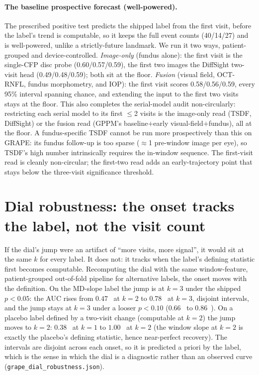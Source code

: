 \paragraph{The baseline prospective forecast (well-powered).} The prescribed positive test predicts the shipped label
from the first visit, before the label's trend is computable, so it keeps the full event counts (\num{40}/\num{14}/\num{27})
and is well-powered, unlike a strictly-future landmark. We run it two ways, patient-grouped and device-controlled.
\emph{Image-only} (fundus alone): the first visit is the single-CFP disc probe (\num{0.60}/\num{0.57}/\num{0.59}), the
first two images the DiffSight two-visit head (\num{0.49}/\num{0.48}/\num{0.59}); both sit at the floor.
\emph{Fusion} (visual field, OCT-RNFL, fundus morphometry, and IOP): the first visit scores
\num{0.58}/\num{0.56}/\num{0.59}, every \num{95}\% interval spanning chance, and extending the input to the first two
visits stays at the floor.
This also completes the serial-model audit non-circularly: restricting each serial model to its first $\leq$2 visits is
the image-only read (TSDF, DiffSight) or the fusion read (GPPM's baseline$+$early visual-field$+$fundus), all at the
floor. A fundus-specific TSDF cannot be run more prospectively than this on GRAPE: its fundus follow-up is too sparse
($\approx$1 pre-window image per eye), so TSDF's high number intrinsically requires the in-window sequence. The
first-visit read is cleanly non-circular; the first-two read adds an early-trajectory point that stays below the
three-visit significance threshold.

\section{Dial robustness: the onset tracks the label, not the visit count}
\label{app:dialrobust}

If the dial's jump were an artifact of ``more visits, more signal'', it would sit at the same $k$ for every label. It
does not: it tracks when the label's defining statistic first becomes computable. Recomputing the dial with the same
window-feature, patient-grouped out-of-fold pipeline for alternative labels, the onset moves with the definition. On the
MD-slope label the jump is at $k{=}3$ under the shipped $p<0.05$: the AUC rises from
$0.47$~ at $k{=}2$ to $0.78$~ at $k{=}3$, disjoint intervals, and the jump stays at $k{=}3$
under a looser $p<0.10$ ($0.66$~ to $0.86$~). On a placebo label defined by a two-visit
change (computable at $k{=}2$) the jump moves to $k{=}2$: $0.38$~ at $k{=}1$ to $1.00$~ at
$k{=}2$ (the window slope at $k{=}2$ is exactly the placebo's defining statistic, hence near-perfect recovery). The
intervals are disjoint across each onset, so it is predicted a priori by the label, which is the sense in which the dial
is a diagnostic rather than an observed curve (\texttt{grape\_dial\_robustness.json}).

